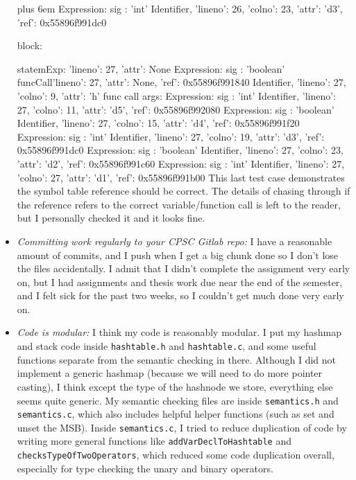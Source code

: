 \documentclass{article}
\makeatletter
\newenvironment{myverb}
 {\def\@xobeysp{\ }\verbatim\rightskip=0pt plus 6em\relax}
 {\endverbatim}
\makeatother
\begin{document}
\begin{itemize}
\begin{myverb}
            Expression: {sig : 'int'}
              Identifier, {'lineno': 26, 'colno': 23, 'attr': 'd3', 'ref': 0x55896f991dc0}

        block:

          statemExp: {'lineno': 27, 'attr': None}
            Expression: {sig : 'boolean'}
              funcCall{'lineno': 27, 'attr': None, 'ref': 0x55896f991840}
                Identifier, {'lineno': 27, 'colno': 9, 'attr': 'h'}
                func call args:
                  Expression: {sig : 'int'}
                    Identifier, {'lineno': 27, 'colno': 11, 'attr': 'd5', 'ref': 0x55896f992080}
                  Expression: {sig : 'boolean'}
                    Identifier, {'lineno': 27, 'colno': 15, 'attr': 'd4', 'ref': 0x55896f991f20}
                  Expression: {sig : 'int'}
                    Identifier, {'lineno': 27, 'colno': 19, 'attr': 'd3', 'ref': 0x55896f991dc0}
                  Expression: {sig : 'boolean'}
                    Identifier, {'lineno': 27, 'colno': 23, 'attr': 'd2', 'ref': 0x55896f991c60}
                  Expression: {sig : 'int'}
                    Identifier, {'lineno': 27, 'colno': 27, 'attr': 'd1', 'ref': 0x55896f991b00}
\end{myverb}
This last test case demonstrates the symbol table reference should be correct. The details of chasing through if the reference refers to the correct variable/function call is left to the reader, but I personally checked it and it looks fine.




    \item \emph{Committing work regularly to your CPSC Gitlab repo:} I have a reasonable amount of commits, and I push when I get a big chunk done so I don't lose the files accidentally. I admit that I didn't complete the assignment very early on, but I had assignments and thesis work due near the end of the semester, and I felt sick for the past two weeks, so I couldn't get much done very early on. 

    \item \emph{Code is modular:} 
        I think my code is reasonably modular. I put my hashmap and stack code inside \verb|hashtable.h| and \verb|hashtable.c|, and some useful functions separate from the semantic checking in there. Although I did not implement a generic hashmap (because we will need to do more pointer casting), I think except the type of the hashnode we store, everything else seems quite generic. My semantic checking files are inside \verb|semantics.h| and \verb|semantics.c|, which also includes helpful helper functions (such as set and unset the MSB). Inside \verb|semantics.c|, I tried to reduce duplication of code by writing more general functions like \verb|addVarDeclToHashtable| and \verb|checksTypeOfTwoOperators|, which reduced some code duplication overall, especially for type checking the unary and binary operators.


\end{itemize}
\end{document}
